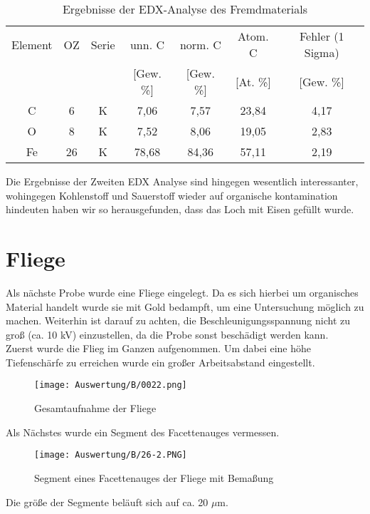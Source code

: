 \begin{table}[h]
    \centering
    \begin{tabular}{c|c|c|c|c|c|c}
        Element & OZ &Serie& unn. C & norm. C &  Atom. C  & Fehler (1 Sigma) \\
         & & & [Gew. \%] & [Gew. \%] & [At. \%] & [Gew. \%] \\
        \hline\hline
        C & 6 & K & 7,06&7,57&23,84 & 4,17\\
        O & 8 & K & 7,52&8,06&19,05 & 2,83\\
        Fe & 26 & K & 78,68&84,36&57,11 & 2,19\\
    \end{tabular}
    \caption{Ergebnisse der EDX-Analyse des Fremdmaterials}
\end{table}

Die Ergebnisse der Zweiten EDX Analyse sind hingegen wesentlich interessanter, wohingegen Kohlenstoff und Sauerstoff wieder auf organische kontamination hindeuten haben wir so herausgefunden, dass das Loch mit Eisen gefüllt wurde.

\newpage
\section{Fliege}

Als nächste Probe wurde eine Fliege eingelegt. Da es sich hierbei um organisches Material handelt wurde sie mit Gold bedampft, um eine Untersuchung möglich zu machen. Weiterhin ist darauf zu achten, die Beschleunigungsspannung nicht zu groß (ca. 10  kV) einzustellen, da die Probe sonst beschädigt werden kann. \\

Zuerst wurde die Flieg im Ganzen aufgenommen. Um dabei eine höhe Tiefenschärfe zu erreichen wurde ein großer Arbeitsabstand eingestellt.
\begin{figure}[h]
    \centering
    \texttt{[image: Auswertung/B/0022.png]}
    \caption{Gesamtaufnahme der Fliege}
\end{figure}

\newpage
Als Nächstes wurde ein Segment des Facettenauges vermessen.
\begin{figure}[h]
    \centering
    \texttt{[image: Auswertung/B/26-2.PNG]}
    \caption{Segment eines Facettenauges der Fliege mit Bemaßung}
\end{figure}

Die größe der Segmente beläuft sich auf ca. 20 $\mu$m.

